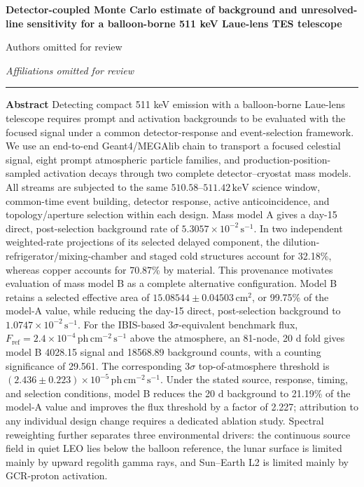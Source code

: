 \documentclass[11pt]{article}
\newcommand{\revblue}[1]{\textcolor{revisionblue}{#1}}
\newcommand{\keV}{\ensuremath{\,\mathrm{keV}}}
\newcommand{\phcms}{\ensuremath{\,\mathrm{ph\,cm^{-2}\,s^{-1}}}}
\newcommand{\cps}{\ensuremath{\,\mathrm{s^{-1}}}}
\newcommand{\fref}{F_{\mathrm{ref}}}
\begin{document}
\thispagestyle{fancy}
\begin{flushleft}
{\LARGE\bfseries Detector-coupled Monte Carlo estimate of background and unresolved-line sensitivity for a balloon-borne 511 keV Laue-lens TES telescope\par}
\vspace{1.1em}
{\large Authors omitted for review\par}
\vspace{0.3em}
{\normalsize\itshape Affiliations omitted for review\par}
\end{flushleft}
\vspace{0.7em}
\noindent\rule{\textwidth}{0.4pt}
\vspace{0.5em}

\noindent\textbf{Abstract}\hspace{0.7em}
Detecting compact 511 keV emission with a balloon-borne Laue-lens telescope
requires prompt and activation backgrounds to be evaluated with the focused
signal under a common detector-response and event-selection framework. We use
an end-to-end Geant4/MEGAlib chain to transport a focused celestial signal,
\revblue{eight prompt atmospheric particle families}, and
production-position-sampled activation decays through two complete
detector--cryostat mass models. All streams are subjected to the same
$510.58$--$511.42\keV$ science window, common-time event building, detector
response, active anticoincidence, and topology/aperture selection within each
design. Mass model A gives a day-15 direct, post-selection background rate of
$5.3057\times10^{-2}\cps$. In two independent weighted-rate projections of its
selected delayed component, the dilution-refrigerator/mixing-chamber and staged
cold structures account for 32.18\%, whereas copper accounts for 70.87\% by
material.
This provenance motivates evaluation of mass model B as a complete alternative
configuration. Model B retains a selected effective area of
$15.08544\pm0.04503\,\mathrm{cm^2}$, or 99.75\% of the model-A value, while
reducing the day-15 direct, post-selection background to $1.0747\times10^{-2}\cps$.
For the IBIS-based $3\sigma$-equivalent benchmark flux,
$\fref=2.4\times10^{-4}\phcms$ above the atmosphere, an 81-node, 20 d fold gives
model B 4028.15 signal and
18568.89 background counts, with a counting significance of 29.561. The
corresponding $3\sigma$ top-of-atmosphere threshold is
$(2.436\pm0.223)\times10^{-5}\phcms$. Under the stated source, response,
timing, and selection conditions, model B reduces the 20 d background to
21.19\% of the model-A value and improves the flux threshold by a
factor of 2.227; attribution to any individual design change requires a
dedicated ablation study.
Spectral reweighting further separates three environmental drivers: the
continuous source field in quiet LEO lies below the balloon reference, the
lunar surface is limited mainly by upward regolith gamma rays, and Sun--Earth
L2 is limited mainly by GCR-proton activation.
\end{document}
